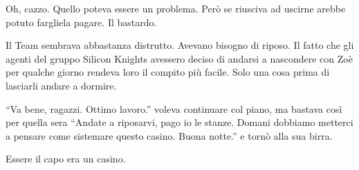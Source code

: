     Oh, cazzo. Quello poteva essere un problema. Però se riusciva ad uscirne arebbe potuto fargliela pagare. Il
    bastardo.

    Il Team sembrava abbastanza distrutto. Avevano bisogno di riposo. Il fatto che gli agenti del gruppo Silicon Knights
    avessero deciso di andarsi a nascondere con Zoè per qualche giorno rendeva loro il compito più facile. Solo una cosa
    prima di lasciarli andare a dormire.

    ``Va bene, ragazzi. Ottimo lavoro.'' voleva continuare col piano, ma bastava così per quella sera ``Andate a
    riposarvi, pago io le stanze. Domani dobbiamo metterci a pensare come sistemare questo casino. Buona notte.'' e
    tornò alla sua birra.

    Essere il capo era un casino.
